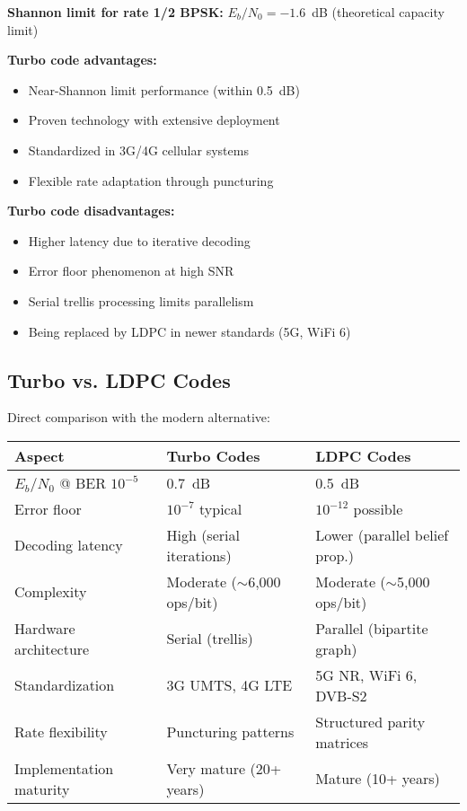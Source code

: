 \textbf{Shannon limit for rate 1/2 BPSK:} $E_b/N_0 = -1.6$~dB (theoretical capacity limit)

\textbf{Turbo code advantages:}
\begin{itemize}
\item Near-Shannon limit performance (within 0.5~dB)
\item Proven technology with extensive deployment
\item Standardized in 3G/4G cellular systems
\item Flexible rate adaptation through puncturing
\end{itemize}

\textbf{Turbo code disadvantages:}
\begin{itemize}
\item Higher latency due to iterative decoding
\item Error floor phenomenon at high SNR
\item Serial trellis processing limits parallelism
\item Being replaced by LDPC in newer standards (5G, WiFi 6)
\end{itemize}

\subsection{Turbo vs. LDPC Codes}

Direct comparison with the modern alternative:

\begin{center}
\begin{tabular}{@{}lll@{}}
\toprule
Aspect & Turbo Codes & LDPC Codes \\
\midrule
$E_b/N_0$ @ BER $10^{-5}$ & 0.7~dB & 0.5~dB \\
Error floor & $10^{-7}$ typical & $10^{-12}$ possible \\
Decoding latency & High (serial iterations) & Lower (parallel belief prop.) \\
Complexity & Moderate ($\sim$6,000 ops/bit) & Moderate ($\sim$5,000 ops/bit) \\
Hardware architecture & Serial (trellis) & Parallel (bipartite graph) \\
Standardization & 3G UMTS, 4G LTE & 5G NR, WiFi 6, DVB-S2 \\
Rate flexibility & Puncturing patterns & Structured parity matrices \\
Implementation maturity & Very mature (20+ years) & Mature (10+ years) \\
\bottomrule
\end{tabular}
\end{center}

